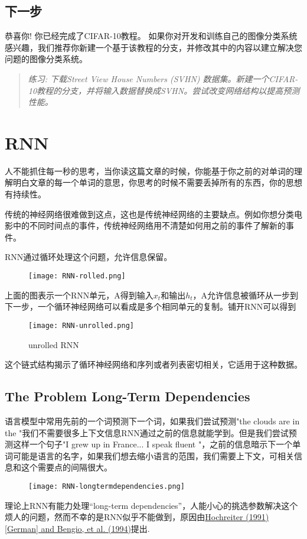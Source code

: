 \subsection{下一步}
恭喜你! 你已经完成了CIFAR-10教程。 如果你对开发和训练自己的图像分类系统感兴趣，我们推荐你新建一个基于该教程的分支，并修改其中的内容以建立解决您问题的图像分类系统。
\begin{quote}
\emph{练习: 下载Street View House Numbers (SVHN) 数据集。新建一个CIFAR-10教程的分支，并将输入数据替换成SVHN。尝试改变网络结构以提高预测性能。}
\end{quote}

\section{RNN}
人不能抓住每一秒的思考，当你读这篇文章的时候，你能基于你之前的对单词的理解明白文章的每一个单词的意思，你思考的时候不需要丢掉所有的东西，你的思想有持续性。\par
传统的神经网络很难做到这点，这也是传统神经网络的主要缺点。例如你想分类电影中的不同时间点的事件，传统神经网络用不清楚如何用之前的事件了解新的事件。\par
RNN通过循环处理这个问题，允许信息保留。\par
\begin{figure}[!ht]
\centering
\texttt{[image: RNN-rolled.png]}
\end{figure}
上面的图表示一个RNN单元，A得到输入$x_t$和输出$h_t$，A允许信息被循环从一步到下一步，一个循环神经网络可以看成是多个相同单元的复制。铺开RNN可以得到
\begin{figure}[!ht]
\centering
\texttt{[image: RNN-unrolled.png]}
\caption{unrolled RNN}
\end{figure}
这个链式结构揭示了循环神经网络和序列或者列表密切相关，它适用于这种数据。
\subsection{The Problem Long-Term Dependencies}
语言模型中常用先前的一个词预测下一个词，如果我们尝试预测"the clouds are in the {\color{red}{sky}}"我们不需要很多上下文信息RNN通过之前的信息就能学到。但是我们尝试预测这样一个句子"I grew up in France... I speak fluent {\color{red}{France}}"，之前的信息暗示下一个单词可能是语言的名字，如果我们想去缩小语言的范围，我们需要上下文{\color{red}{France}}，可相关信息和这个需要点的间隔很大。
\begin{figure}[!ht]
\centering
\texttt{[image: RNN-longtermdependencies.png]}
\end{figure}
理论上RNN有能力处理“long-term dependencies”，人能小心的挑选参数解决这个烦人的问题，然而不幸的是RNN似乎不能做到，原因由\href{http://www-dsi.ing.unifi.it/~paolo/ps/tnn-94-gradient.pdf}{Hochreiter (1991) [German] and Bengio, et al. (1994)}提出.

